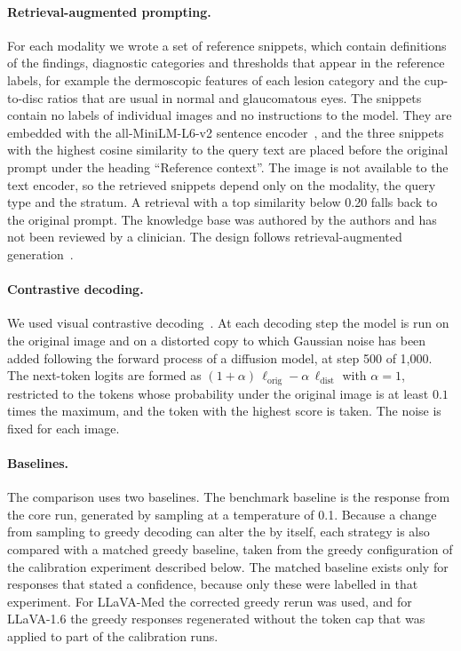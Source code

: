 \paragraph{Retrieval-augmented prompting.} For each modality we wrote a set of reference snippets, which contain definitions of the findings, diagnostic categories and thresholds that appear in the reference labels, for example the dermoscopic features of each lesion category and the cup-to-disc ratios that are usual in normal and glaucomatous eyes. The snippets contain no labels of individual images and no instructions to the model. They are embedded with the all-MiniLM-L6-v2 sentence encoder~\citep{reimers2019sbert}, and the three snippets with the highest cosine similarity to the query text are placed before the original prompt under the heading ``Reference context''. The image is not available to the text encoder, so the retrieved snippets depend only on the modality, the query type and the stratum. A retrieval with a top similarity below 0.20 falls back to the original prompt. The knowledge base was authored by the authors and has not been reviewed by a clinician. The design follows retrieval-augmented generation~\citep{lewis2020rag}.

\paragraph{Contrastive decoding.} We used visual contrastive decoding~\citep{leng2024vcd}. At each decoding step the model is run on the original image and on a distorted copy to which Gaussian noise has been added following the forward process of a diffusion model, at step 500 of 1{,}000. The next-token logits are formed as $(1+\alpha)\,\ell_{\mathrm{orig}} - \alpha\,\ell_{\mathrm{dist}}$ with $\alpha=1$, restricted to the tokens whose probability under the original image is at least $0.1$ times the maximum, and the token with the highest score is taken. The noise is fixed for each image.

\paragraph{Baselines.} The comparison uses two baselines. The benchmark baseline is the response from the core run, generated by sampling at a temperature of 0.1. Because a change from sampling to greedy decoding can alter the \SMHR{} by itself, each strategy is also compared with a matched greedy baseline, taken from the greedy configuration of the calibration experiment described below. The matched baseline exists only for responses that stated a confidence, because only these were labelled in that experiment. For LLaVA-Med the corrected greedy rerun was used, and for LLaVA-1.6 the greedy responses regenerated without the token cap that was applied to part of the calibration runs.

